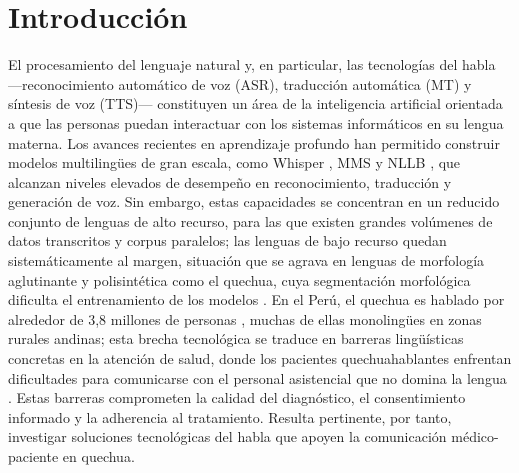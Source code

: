 %
%     
%     
%

\section*{Introducción}

El procesamiento del lenguaje natural y, en particular, las tecnologías del
habla —reconocimiento automático de voz (ASR), traducción automática (MT) y
síntesis de voz (TTS)— constituyen un área de la inteligencia artificial
orientada a que las personas puedan interactuar con los sistemas informáticos
en su lengua materna. Los avances recientes en aprendizaje profundo han
permitido construir modelos multilingües de gran escala, como Whisper
\parencite{radford2023whisper}, MMS \parencite{pratap2024mms} y NLLB
\parencite{costajussa2022nllb}, que alcanzan niveles elevados de desempeño en
reconocimiento, traducción y generación de voz. Sin embargo, estas capacidades
se concentran en un reducido conjunto de lenguas de alto recurso, para las que
existen grandes volúmenes de datos transcritos y corpus paralelos; las lenguas
de bajo recurso quedan sistemáticamente al margen, situación que se agrava en
lenguas de morfología aglutinante y polisintética como el quechua, cuya
segmentación morfológica dificulta el entrenamiento de los modelos
\parencite{ortega2020quechua}. En el Perú, el quechua es hablado por alrededor
de 3,8 millones de personas \parencite{inei2017}, muchas de ellas monolingües en
zonas rurales andinas; esta brecha tecnológica se traduce en barreras
lingüísticas concretas en la atención de salud, donde los pacientes
quechuahablantes enfrentan dificultades para comunicarse con el personal
asistencial que no domina la lengua \parencite{begazo2026,cuaila2022}. Estas
barreras comprometen la calidad del diagnóstico, el consentimiento informado y
la adherencia al tratamiento. Resulta
pertinente, por tanto, investigar soluciones tecnológicas del habla que apoyen
la comunicación médico-paciente en quechua.

